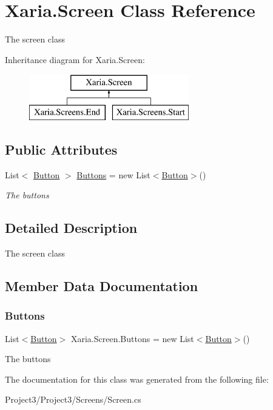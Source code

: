 \hypertarget{classXaria_1_1Screen}{}\section{Xaria.\+Screen Class Reference}
\label{classXaria_1_1Screen}


The screen class  


Inheritance diagram for Xaria.\+Screen\+:\begin{figure}[H]
\begin{center}
\leavevmode
\includegraphics[height=2.000000cm]{classXaria_1_1Screen}
\end{center}
\end{figure}
\subsection*{Public Attributes}
\begin{DoxyCompactItemize}
\item 
List$<$ \hyperlink{classXaria_1_1Button}{Button} $>$ \hyperlink{classXaria_1_1Screen_a5c4462ed8308bf53726d61f078e705e7}{Buttons} = new List$<$\hyperlink{classXaria_1_1Button}{Button}$>$()
\begin{DoxyCompactList}\small\item\em The buttons \end{DoxyCompactList}\end{DoxyCompactItemize}


\subsection{Detailed Description}
The screen class 



\subsection{Member Data Documentation}
\mbox{\label{classXaria_1_1Screen_a5c4462ed8308bf53726d61f078e705e7}} 
\subsubsection{\texorpdfstring{Buttons}{Buttons}}
{\footnotesize\ttfamily List$<$\hyperlink{classXaria_1_1Button}{Button}$>$ Xaria.\+Screen.\+Buttons = new List$<$\hyperlink{classXaria_1_1Button}{Button}$>$()}



The buttons 



The documentation for this class was generated from the following file\+:\begin{DoxyCompactItemize}
\item 
Project3/\+Project3/\+Screens/Screen.\+cs\end{DoxyCompactItemize}
